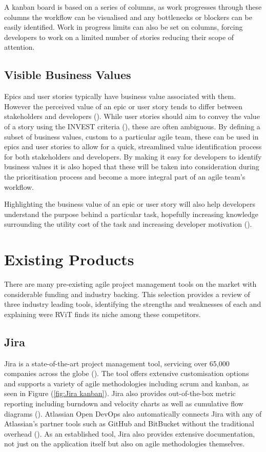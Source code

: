 \documentclass[l4proj.tex]{subfiles}
\begin{document}
A kanban board is based on a series of columns, as work progresses through these columns the workflow can be visualised and any bottlenecks or blockers can be easily identified. Work in progress limits can also be set on columns, forcing developers to work on a limited number of stories reducing their scope of attention.


\subsection{Visible Business Values}

Epics and user stories typically have business value associated with them. However the perceived value of an epic or user story tends to differ between stakeholders and developers (\cite{Gregory2020}). While user stories should aim to convey the value of a story using the INVEST criteria (\cite{Buglione2013}), these are often ambiguous. By defining a subset of business values, custom to a particular agile team, these can be used in epics and user stories to allow for a quick, streamlined value identification process for both stakeholders and developers. By making it easy for developers to identify business values it is also hoped that these will be taken into consideration during the prioritisation process and become a more integral part of an agile team's workflow. 

Highlighting the business value of an epic or user story will also help developers understand the purpose behind a particular task, hopefully increasing knowledge surrounding the utility cost of the task and increasing developer motivation (\cite{Wigfield2000}). 

\section{Existing Products}
There are many pre-existing agile project management tools on the market with considerable funding and industry backing. This selection provides a review of three industry leading tools, identifying the strengths and weaknesses of each and explaining were RViT finds its niche among these competitors.


\subsection{Jira}
Jira is a state-of-the-art project management tool, servicing over 65,000 companies across the globe (\cite{JiraUsers}). The tool offers extensive customisation options and supports a variety of agile methodologies including scrum and kanban, as seen in Figure (\ref{fig:Jira kanban}).
Jira also provides out-of-the-box metric reporting including burndown and velocity charts as well as cumulative flow diagrams (\cite{JiraReports}). Atlassian Open DevOps also automatically connects Jira with any of Atlassian's partner tools such as GitHub and BitBucket without the traditional overhead (\cite{JiraDevOps}). As an established tool, Jira also provides extensive documentation, not just on the application itself but also on agile methodologies themselves.
\end{document}
